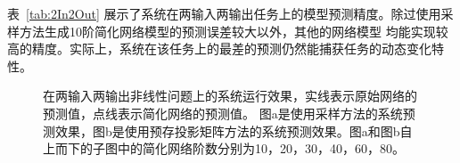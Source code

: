 表~\ref{tab:2In2Out} 展示了系统在两输入两输出任务上的模型预测精度。除过使用采样方法生成10阶简化网络模型的预测误差较大以外，其他的网络模型
均能实现较高的精度。实际上，系统在该任务上的最差的预测仍然能捕获任务的动态变化特性。

\begin{figure}
	\centering
	\caption{在两输入两输出非线性问题上的系统运行效果，实线表示原始网络的预测值，点线表示简化网络的预测值。
		图a是使用采样方法的系统预测效果，图b是使用预存投影矩阵方法的系统预测效果。图a和图b自上而下的子图中的简化网络阶数分别为10，20，30，40，60，80。}
	\label{fig:2In2Out}
\end{figure}


